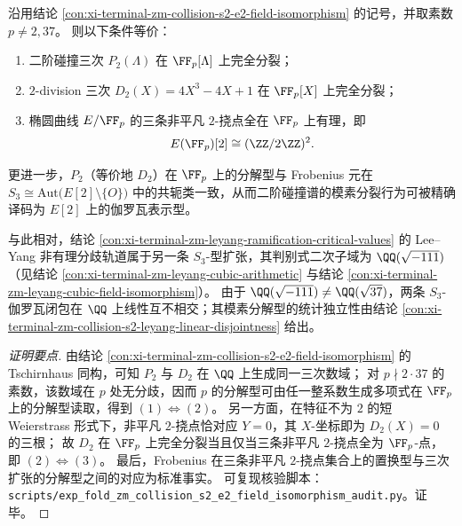 \begin{conclusion}\label{con:xi-terminal-zm-collision-s2-splitting-e2-torsion}
沿用结论 \ref{con:xi-terminal-zm-collision-s2-e2-field-isomorphism} 的记号，并取素数 \(p\neq 2,37\)。
则以下条件等价：
\begin{enumerate}
  \item 二阶碰撞三次 \(P_2(\Lambda)\) 在 \(\FF_p[\Lambda]\) 上完全分裂；
  \item \(2\)-division 三次 \(D_2(X)=4X^3-4X+1\) 在 \(\FF_p[X]\) 上完全分裂；
  \item 椭圆曲线 \(E/\FF_p\) 的三条非平凡 \(2\)-挠点全在 \(\FF_p\) 上有理，即
  \[
  E(\FF_p)[2]\cong (\ZZ/2\ZZ)^2.
  \]
\end{enumerate}
更进一步，\(P_2\)（等价地 \(D_2\)）在 \(\FF_p\) 上的分解型与 Frobenius 元在
\(
S_3\cong \mathrm{Aut}\bigl(E[2]\setminus\{O\}\bigr)
\)
中的共轭类一致，从而二阶碰撞谱的模素分裂行为可被精确译码为 \(E[2]\) 上的伽罗瓦表示型。
\par
与此相对，结论 \ref{con:xi-terminal-zm-leyang-ramification-critical-values} 的 Lee--Yang 非有理分歧轨道属于另一条 \(S_3\)-型扩张，其判别式二次子域为 \(\QQ(\sqrt{-111})\)（见结论 \ref{con:xi-terminal-zm-leyang-cubic-arithmetic} 与结论 \ref{con:xi-terminal-zm-leyang-cubic-field-isomorphism}）。
由于 \(\QQ(\sqrt{-111})\neq \QQ(\sqrt{37})\)，两条 \(S_3\)-伽罗瓦闭包在 \(\QQ\) 上线性互不相交；其模素分解型的统计独立性由结论 \ref{con:xi-terminal-zm-collision-s2-leyang-linear-disjointness} 给出。
\end{conclusion}
\begin{proof}[证明要点]
由结论 \ref{con:xi-terminal-zm-collision-s2-e2-field-isomorphism} 的 Tschirnhaus 同构，可知 \(P_2\) 与 \(D_2\) 在 \(\QQ\) 上生成同一三次数域；
对 \(p\nmid 2\cdot 37\) 的素数，该数域在 \(p\) 处无分歧，因而 \(p\) 的分解型可由任一整系数生成多项式在 \(\FF_p\) 上的分解型读取，得到 \((1)\Longleftrightarrow(2)\)。
另一方面，在特征不为 \(2\) 的短 Weierstrass 形式下，非平凡 \(2\)-挠点恰对应 \(Y=0\)，其 \(X\)-坐标即为 \(D_2(X)=0\) 的三根；
故 \(D_2\) 在 \(\FF_p\) 上完全分裂当且仅当三条非平凡 \(2\)-挠点全为 \(\FF_p\)-点，即 \((2)\Longleftrightarrow(3)\)。
最后，Frobenius 在三条非平凡 \(2\)-挠点集合上的置换型与三次扩张的分解型之间的对应为标准事实。
可复现核验脚本：\texttt{scripts/exp\_fold\_zm\_collision\_s2\_e2\_field\_isomorphism\_audit.py}。证毕。
\end{proof}

